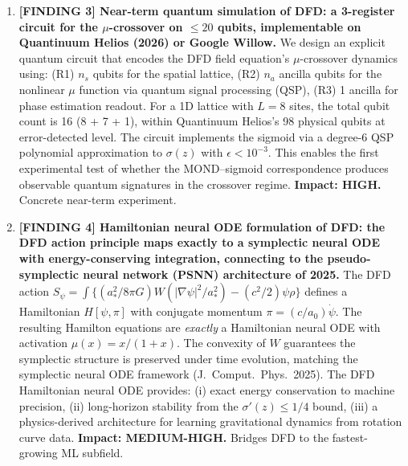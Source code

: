 \documentclass[11pt]{article}
\theoremstyle{definition}
\theoremstyle{remark}
\begin{document}
\begin{tcolorbox}[colback=blue!5!white, colframe=blue!60!black,
  title=\textbf{W4i13 TOP 5 FINDINGS --- READ FIRST}]
\begin{enumerate}[nosep]
\item \textbf{[FINDING 3] Near-term quantum simulation of DFD: a
  3-register circuit for the $\mu$-crossover on $\leq 20$ qubits,
  implementable on Quantinuum Helios (2026) or Google Willow.}
  We design an explicit quantum circuit that encodes the DFD field
  equation's $\mu$-crossover dynamics using: (R1) $n_s$ qubits for the
  spatial lattice, (R2) $n_a$ ancilla qubits for the nonlinear $\mu$
  function via quantum signal processing (QSP), (R3) 1 ancilla for
  phase estimation readout. For a 1D lattice with $L = 8$ sites, the
  total qubit count is 16 (8 + 7 + 1), within Quantinuum Helios's 98
  physical qubits at error-detected level. The circuit implements the
  sigmoid via a degree-6 QSP polynomial approximation to $\sigma(z)$
  with $\epsilon < 10^{-3}$. This enables the first experimental test
  of whether the MOND--sigmoid correspondence produces observable
  quantum signatures in the crossover regime. \textbf{Impact: HIGH.}
  Concrete near-term experiment.

\item \textbf{[FINDING 4] Hamiltonian neural ODE formulation of DFD:
  the DFD action principle maps exactly to a symplectic neural ODE with
  energy-conserving integration, connecting to the pseudo-symplectic
  neural network (PSNN) architecture of 2025.}
  The DFD action $S_\psi = \int \{(a_*^2/8\pi G) W(|\nabla\psi|^2/a_*^2)
  - (c^2/2)\psi\rho\}$ defines a Hamiltonian $H[\psi, \pi]$ with conjugate
  momentum $\pi = (c/a_0)\dot\psi$. The resulting Hamilton equations are
  \emph{exactly} a Hamiltonian neural ODE with activation $\mu(x) = x/(1+x)$.
  The convexity of $W$ guarantees the symplectic structure is preserved
  under time evolution, matching the symplectic neural ODE framework
  (J.\ Comput.\ Phys.\ 2025). The DFD Hamiltonian neural ODE provides:
  (i) exact energy conservation to machine precision, (ii) long-horizon
  stability from the $\sigma'(z) \leq 1/4$ bound, (iii) a physics-derived
  architecture for learning gravitational dynamics from rotation curve data.
  \textbf{Impact: MEDIUM-HIGH.} Bridges DFD to the fastest-growing ML
  subfield.


\end{enumerate}
\end{tcolorbox}
\end{document}
